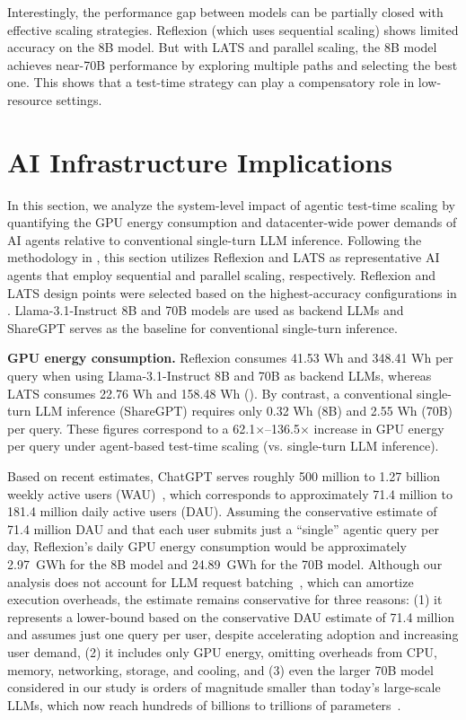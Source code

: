 Interestingly, the performance gap between models can be partially closed with effective scaling strategies. Reflexion (which uses sequential scaling) shows limited accuracy on the 8B model. But with LATS and parallel scaling, the 8B model achieves near-70B performance by exploring multiple paths and selecting the best one. This shows that a test-time strategy can play a compensatory role in low-resource settings.



\section{AI Infrastructure Implications}
\label{sect:ai_infra}

In this section, we analyze the system-level impact of agentic test-time scaling by quantifying the GPU energy consumption and datacenter-wide power demands of AI agents relative to conventional single-turn LLM inference. Following the methodology in , this section utilizes  Reflexion and LATS as representative AI agents that employ sequential and parallel scaling, respectively. Reflexion and LATS design points were selected based on the highest-accuracy configurations in . Llama-3.1-Instruct 8B and 70B models are used as backend LLMs and ShareGPT serves as the baseline for conventional single-turn inference.

\textbf{GPU energy consumption.} 
Reflexion consumes 41.53 Wh and 348.41 Wh per query when using Llama-3.1-Instruct 8B and 70B as backend LLMs, whereas LATS consumes 22.76 Wh and 158.48 Wh (). By contrast, a conventional single-turn LLM inference (ShareGPT) requires only 0.32 Wh (8B) and 2.55 Wh (70B) per query. These figures correspond to a 62.1$\times$–136.5$\times$ increase in GPU energy per query under agent-based test-time scaling (vs. single-turn LLM inference).

Based on recent estimates, ChatGPT serves roughly 500 million to 1.27 billion weekly active users (WAU)~\cite{chatgpt_wau_500M,similarweb_chatgpt_2025,demandsage_chatgpt_stats,forbes_chatgpt_1b_2025}, which corresponds to approximately 71.4 million to 181.4 million daily active users (DAU). Assuming the conservative estimate of 71.4 million DAU and that each user submits just a ``single'' agentic query per day, Reflexion’s daily GPU energy consumption would be approximately 2.97~GWh for the 8B model and 24.89~GWh for the 70B model. Although our analysis does not account for LLM request batching~\cite{orca,vllm}, which can amortize execution overheads, the estimate remains conservative for three reasons: (1) it represents a lower-bound based on the conservative DAU estimate of 71.4 million and assumes just one query per user, despite accelerating adoption and increasing user demand, (2) it includes only GPU energy, omitting overheads from CPU, memory, networking, storage, and cooling, and (3) even the larger 70B model considered in our study is orders of magnitude smaller than today's large-scale LLMs, which now reach hundreds of billions to trillions of parameters~\cite{meta2025llama4,moonshot2025kimi,deepseekai2025deepseekr1,felloai2024gemini15}.

